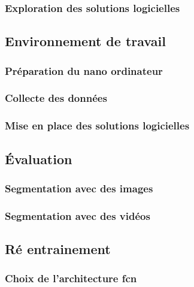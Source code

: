 \subsubsection{Exploration des solutions logicielles}

\subsection{Environnement de travail}

\subsubsection{Préparation du nano ordinateur}
\label{preparation_nano_ordinateur}
\subsubsection{Collecte des données}
\label{section:collecte_donnees}
\subsubsection{Mise en place des solutions logicielles}

\subsection{Évaluation}

\subsubsection{Segmentation avec des images}

\subsubsection{Segmentation avec des vidéos}

\subsection{Ré entrainement}

\subsubsection{Choix de l'architecture \acrshort{fcn}}
\label{section:choix_modele_architecture}
% 
% 